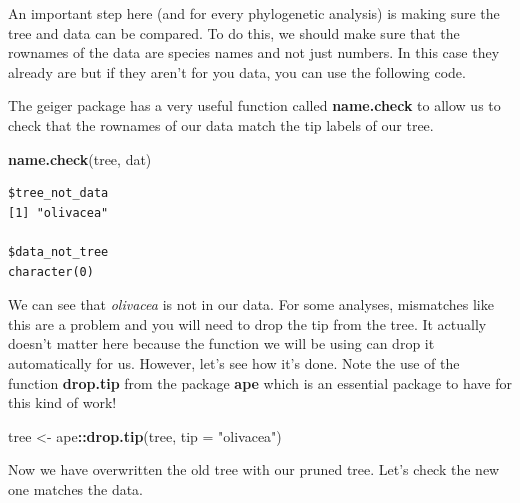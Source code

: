 \documentclass[
]{book}
\newenvironment{Shaded}{\begin{snugshade}}{\end{snugshade}}
\newcommand{\CommentTok}[1]{\textcolor[rgb]{0.56,0.35,0.01}{\textit{#1}}}
\newcommand{\DataTypeTok}[1]{\textcolor[rgb]{0.13,0.29,0.53}{#1}}
\newcommand{\KeywordTok}[1]{\textcolor[rgb]{0.13,0.29,0.53}{\textbf{#1}}}
\newcommand{\NormalTok}[1]{#1}
\newcommand{\OperatorTok}[1]{\textcolor[rgb]{0.81,0.36,0.00}{\textbf{#1}}}
\newcommand{\StringTok}[1]{\textcolor[rgb]{0.31,0.60,0.02}{#1}}
\begin{document}
An important step here (and for every phylogenetic analysis) is making sure the tree and data can be compared. To do this, we should make sure that the rownames of the data are species names and not just numbers. In this case they already are but if they aren't for you data, you can use the following code.

\begin{Shaded}
\end{Shaded}

The geiger package has a very useful function called \textbf{name.check} to allow us to check that the rownames of our data match the tip labels of our tree.

\begin{Shaded}
\begin{Highlighting}[]
\KeywordTok{name.check}\NormalTok{(tree, dat)}
\end{Highlighting}
\end{Shaded}

\begin{verbatim}
$tree_not_data
[1] "olivacea"

$data_not_tree
character(0)
\end{verbatim}

We can see that \emph{olivacea} is not in our data. For some analyses, mismatches like this are a problem and you will need to drop the tip from the tree. It actually doesn't matter here because the function we will be using can drop it automatically for us. However, let's see how it's done. Note the use of the function \textbf{drop.tip} from the package \textbf{ape} \citep{ape} which is an essential package to have for this kind of work!

\begin{Shaded}
\begin{Highlighting}[]
\NormalTok{tree \textless{}{-}}\StringTok{ }\NormalTok{ape}\OperatorTok{::}\KeywordTok{drop.tip}\NormalTok{(tree, }\DataTypeTok{tip =} \StringTok{"olivacea"}\NormalTok{)}
\end{Highlighting}
\end{Shaded}

Now we have overwritten the old tree with our pruned tree. Let's check the new one matches the data.
\end{document}

